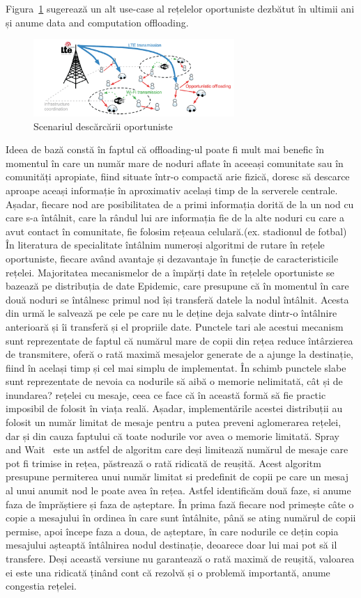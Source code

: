 \documentclass[12pt,a4paper]{report}
\begin{document}
Figura~\ref{fig:pic1} sugerează un alt use-case al rețelelor oportuniste dezbătut în ultimii ani și anume data and computation offloading.
\begin{figure}[th]
\centering
\includegraphics[width=3in]{pics/ONs.png}
  \caption{Scenariul descărcării oportuniste}
  \label{fig:pic1}
\end{figure}
Ideea de bază constă în faptul că offloading-ul poate fi mult mai benefic în momentul în care un număr mare de noduri aflate în aceeași comunitate sau în comunități apropiate, fiind situate într-o compactă arie fizică, doresc să descarce aproape aceași informație în aproximativ același timp de la serverele centrale. Așadar, fiecare nod are posibilitatea de a primi informația dorită de la un nod cu care s-a întâlnit, care la rândul lui are informația fie de la alte noduri cu care a avut contact în comunitate, fie folosim rețeaua celulară.(ex. stadionul de fotbal)
În literatura de specialitate întâlnim numeroși algoritmi de rutare în rețele oportuniste, fiecare având avantaje și dezavantaje în funcție de caracteristicile rețelei. Majoritatea mecanismelor de a împărți date în rețelele oportuniste se bazează pe distribuția de date Epidemic, care presupune că în momentul în care două noduri se întâlnesc primul nod își transferă datele la nodul întâlnit.  Acesta din urmă le salvează pe cele pe care nu le deține deja salvate dintr-o întâlnire anterioară și îi transferă și el propriile date. Punctele tari ale acestui mecanism sunt reprezentate de faptul că numărul mare de copii din rețea reduce întârzierea de transmitere, oferă o rată maximă mesajelor generate de a ajunge la destinație, fiind în același timp și cel mai simplu de implementat. În schimb punctele slabe sunt reprezentate de nevoia ca nodurile să aibă o memorie nelimitată, cât și de inundarea? rețelei cu mesaje, ceea ce face că în această formă să fie practic imposibil de folosit în viața reală. Așadar, implementările acestei distribuții au folosit un număr limitat de mesaje pentru a putea preveni aglomerarea rețelei, dar și din cauza faptului că toate nodurile vor avea o memorie limitată. Spray and Wait~\cite{SprayAndWait} este un astfel de algoritm care deși limitează numărul de mesaje care pot fi trimise in rețea, păstrează o rată ridicată de reușită. Acest algoritm presupune permiterea unui număr limitat si predefinit de copii pe care un mesaj al unui anumit nod le poate avea în rețea. Astfel identificăm două faze, si anume faza de împrăștiere și faza de așteptare. În prima fază fiecare nod primește câte o copie a mesajului în ordinea în care sunt întâlnite, până se ating numărul de copii permise, apoi începe faza a doua, de așteptare, în care nodurile ce dețin copia mesajului așteaptă întâlnirea nodul destinație, deoarece doar lui mai pot să il transfere. Deși această versiune nu garantează o rată maximă de reușită, valoarea ei este una ridicată ținând cont că rezolvă și o problemă importantă, anume congestia rețelei. 
\end{document}
